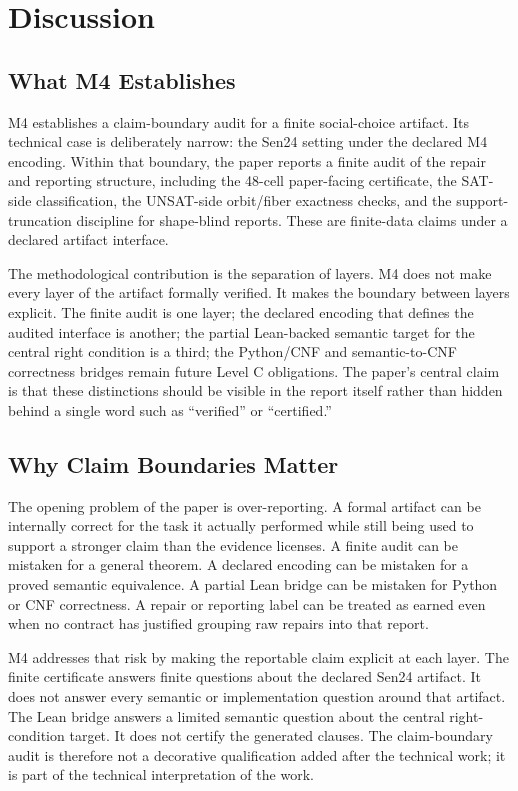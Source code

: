 \section{Discussion}

\subsection{What M4 Establishes}

M4 establishes a claim-boundary audit for a finite social-choice artifact. Its
technical case is deliberately narrow: the Sen24 setting under the declared
M4 encoding. Within that boundary, the paper reports a finite audit of the
repair and reporting structure, including the 48-cell paper-facing
certificate, the SAT-side  classification, the UNSAT-side
orbit/fiber exactness checks, and the support-truncation discipline for
shape-blind reports. These are finite-data claims under a declared artifact
interface.

The methodological contribution is the separation of layers. M4 does not make
every layer of the artifact formally verified. It makes the boundary between
layers explicit. The finite audit is one layer; the declared encoding that
defines the audited interface is another; the partial Lean-backed semantic
target for the central right condition is a third; the Python/CNF and
semantic-to-CNF correctness bridges remain future Level C obligations. The
paper's central claim is that these distinctions should be visible in the
report itself rather than hidden behind a single word such as ``verified'' or
``certified.''

\subsection{Why Claim Boundaries Matter}

The opening problem of the paper is over-reporting. A formal artifact can be
internally correct for the task it actually performed while still being used
to support a stronger claim than the evidence licenses. A finite audit can be
mistaken for a general theorem. A declared encoding can be mistaken for a
proved semantic equivalence. A partial Lean bridge can be mistaken for Python
or CNF correctness. A repair or reporting label can be treated as earned even
when no contract has justified grouping raw repairs into that report.

M4 addresses that risk by making the reportable claim explicit at each layer.
The finite certificate answers finite questions about the declared Sen24
artifact. It does not answer every semantic or implementation question around
that artifact. The Lean bridge answers a limited semantic question about the
central right-condition target. It does not certify the generated clauses. The
claim-boundary audit is therefore not a decorative qualification added after
the technical work; it is part of the technical interpretation of the work.

